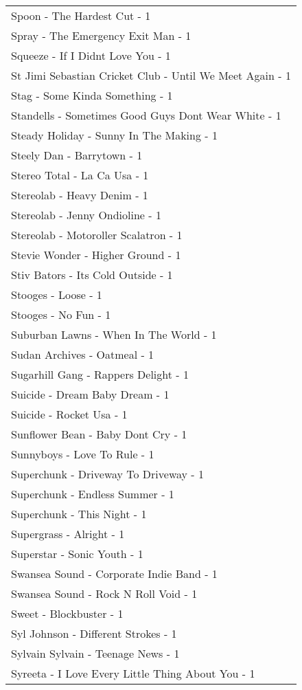 \documentclass[
]{article}
\begin{document}
\begin{longtable}{l}
Spoon - The Hardest Cut - 1 \\ 
Spray - The Emergency Exit Man - 1 \\ 
Squeeze - If I Didnt Love You - 1 \\ 
St Jimi Sebastian Cricket Club - Until We Meet Again - 1 \\ 
Stag - Some Kinda Something - 1 \\ 
Standells - Sometimes Good Guys Dont Wear White - 1 \\ 
Steady Holiday - Sunny In The Making - 1 \\ 
Steely Dan - Barrytown - 1 \\ 
Stereo Total - La Ca Usa - 1 \\ 
Stereolab - Heavy Denim - 1 \\ 
Stereolab - Jenny Ondioline - 1 \\ 
Stereolab - Motoroller Scalatron - 1 \\ 
Stevie Wonder - Higher Ground - 1 \\ 
Stiv Bators - Its Cold Outside - 1 \\ 
Stooges - Loose - 1 \\ 
Stooges - No Fun - 1 \\ 
Suburban Lawns - When In The World - 1 \\ 
Sudan Archives - Oatmeal - 1 \\ 
Sugarhill Gang - Rappers Delight - 1 \\ 
Suicide - Dream Baby Dream - 1 \\ 
Suicide - Rocket Usa - 1 \\ 
Sunflower Bean - Baby Dont Cry - 1 \\ 
Sunnyboys - Love To Rule - 1 \\ 
Superchunk - Driveway To Driveway - 1 \\ 
Superchunk - Endless Summer - 1 \\ 
Superchunk - This Night - 1 \\ 
Supergrass - Alright - 1 \\ 
Superstar - Sonic Youth - 1 \\ 
Swansea Sound - Corporate Indie Band - 1 \\ 
Swansea Sound - Rock N Roll Void - 1 \\ 
Sweet - Blockbuster - 1 \\ 
Syl Johnson - Different Strokes - 1 \\ 
Sylvain Sylvain - Teenage News - 1 \\ 
Syreeta - I Love Every Little Thing About You - 1 \\ 

\end{longtable}
\end{document}
